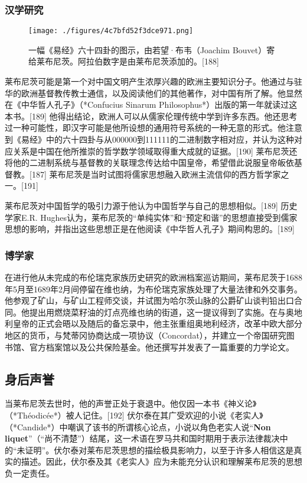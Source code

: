 \subsubsection{汉学研究}
\begin{figure}[ht]
\centering
\texttt{[image: ./figures/4c7bfd52f3dce971.png]}
\caption{一幅《易经》六十四卦的图示，由若望·布韦（Joachim Bouvet）寄给莱布尼茨。阿拉伯数字是由莱布尼茨添加的。[188]} \label{fig_LBNC_6}
\end{figure}
莱布尼茨可能是第一个对中国文明产生浓厚兴趣的欧洲主要知识分子。他通过与驻华的欧洲基督教传教士通信，以及阅读他们的其他著作，对中国有所了解。他显然在《中华哲人孔子》（*Confucius Sinarum Philosophus*）出版的第一年就读过这本书。[189] 他得出结论，欧洲人可以从儒家伦理传统中学到许多东西。他还思考过一种可能性，即汉字可能是他所设想的通用符号系统的一种无意的形式。他注意到《易经》中的六十四卦与从000000到111111的二进制数字相对应，并认为这种对应关系是中国在他所推崇的哲学数学领域取得重大成就的证据。[190] 莱布尼茨还将他的二进制系统与基督教的关联理念传达给中国皇帝，希望借此说服皇帝皈依基督教。[187] 莱布尼茨是当时试图将儒家思想融入欧洲主流信仰的西方哲学家之一。[191]

莱布尼茨对中国哲学的吸引力源于他认为中国哲学与自己的思想相似。[189] 历史学家E.R. Hughes认为，莱布尼茨的“单纯实体”和“预定和谐”的思想直接受到儒家思想的影响，并指出这些思想正是在他阅读《中华哲人孔子》期间构思的。[189]
\subsubsection{博学家}
在进行他从未完成的布伦瑞克家族历史研究的欧洲档案巡访期间，莱布尼茨于1688年5月至1689年2月间停留在维也纳，为布伦瑞克家族处理了大量法律和外交事务。他参观了矿山，与矿山工程师交谈，并试图为哈尔茨山脉的公爵矿山谈判铅出口合同。他提出用燃烧菜籽油的灯点亮维也纳的街道，这一提议得到了实施。在与奥地利皇帝的正式会晤以及随后的备忘录中，他主张重组奥地利经济，改革中欧大部分地区的货币，与梵蒂冈协商达成一项协议（Concordat），并建立一个帝国研究图书馆、官方档案馆以及公共保险基金。他还撰写并发表了一篇重要的力学论文。
\subsection{身后声誉}
当莱布尼茨去世时，他的声誉正处于衰退中。他仅因一本书《神义论》（*Théodicée*）被人记住。[192] 伏尔泰在其广受欢迎的小说《老实人》（*Candide*）中嘲讽了该书的所谓核心论点，小说以角色老实人说“\textbf{Non liquet}”（“尚不清楚”）结尾，这一术语在罗马共和国时期用于表示法律裁决中的“未证明”。伏尔泰对莱布尼茨思想的描绘极具影响力，以至于许多人相信这是真实的描述。因此，伏尔泰及其《老实人》应为未能充分认识和理解莱布尼茨的思想负一定责任。

